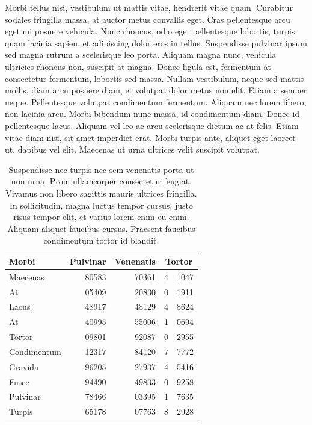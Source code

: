 Morbi tellus nisi, vestibulum ut mattis vitae, hendrerit vitae quam.
Curabitur sodales fringilla massa, at auctor metus convallis eget.
Cras pellentesque arcu eget mi posuere vehicula.
Nunc rhoncus, odio eget pellentesque lobortis, turpis quam lacinia sapien, et adipiscing dolor eros in tellus.
Suspendisse pulvinar ipsum sed magna rutrum a scelerisque leo porta.
Aliquam magna nunc, vehicula ultricies rhoncus non, suscipit at magna.
Donec ligula est, fermentum at consectetur fermentum, lobortis sed massa.
Nullam vestibulum, neque sed mattis mollis, diam arcu posuere diam, et volutpat dolor metus non elit.
Etiam a semper neque.
Pellentesque volutpat condimentum fermentum.
Aliquam nec lorem libero, non lacinia arcu.
Morbi bibendum nunc massa, id condimentum diam.
Donec id pellentesque lacus.
Aliquam vel leo ac arcu scelerisque dictum ac at felis.
Etiam vitae diam nisi, sit amet imperdiet erat.
Morbi turpis ante, aliquet eget laoreet ut, dapibus vel elit.
Maecenas ut urna ultrices velit suscipit volutpat.

\begin{table}[t]
  \centering
  \begin{tabular}{lrrl@{.}r}
    \toprule
    Morbi & Pulvinar & Venenatis & \multicolumn{2}{c}{Tortor}\\
    \midrule
    Maecenas		& 80583 & 70361 & 4&1047\\
    At			& 05409 & 20830 & 0&1911\\
    Lacus			& 48917 & 48129 & 4&8624\\
    At			& 40995 & 55006 & 1&0694\\
    Tortor			& 09801 & 92087 & 0&2955\\
    Condimentum		& 12317 & 84120 & 7&7772\\
    Gravida		& 96205 & 27937 & 4&5416\\
    Fusce			& 94490 & 49833 & 0&9258\\
    Pulvinar		& 78466 & 03395 & 1&7635\\
    Turpis			& 65178 & 07763 & 8&2928\\
    \bottomrule
  \end{tabular}
  \caption[Suspendisse nec turpis]{
    Suspendisse nec turpis nec sem venenatis porta ut non urna.
Proin ullamcorper consectetur feugiat.
Vivamus non libero sagittis mauris ultrices fringilla.
In sollicitudin, magna luctus tempor cursus, justo risus tempor elit, et varius lorem enim eu enim.
Aliquam aliquet faucibus cursus.
Praesent faucibus condimentum tortor id blandit.
  }
\end{table}

